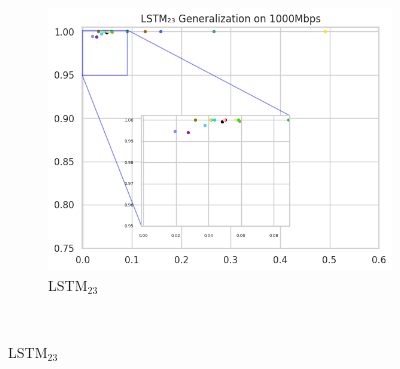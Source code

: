 \documentclass[a4paper,fleqn]{cas-sc}
\begin{document}
\begin{figure}[h!]
\begin{minipage}[t]{0.46\textwidth}
\begin{subfigure}[t]{0.33\textwidth}
			\includegraphics[draft=false, width=\textwidth]{./figs/Generalizacao-LSTM23-1000Mbps.png} 
			\caption{LSTM$_{23}$}
			\label{fig:Generalizacao-LSTM23-1000Mbps}
		\end{subfigure}%
		~%
		

\end{minipage}
\end{figure}
\end{document}
